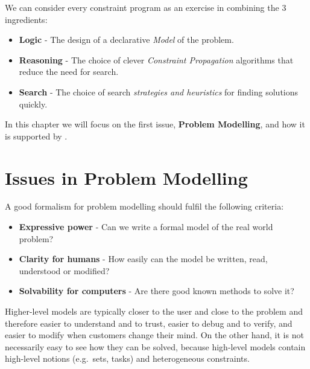 We can consider every constraint program as an exercise in
combining the 3 ingredients:
\begin{itemize}
\item {\bf Logic} -  The design of a declarative {\em Model} of the problem.
\item {\bf Reasoning} - The choice of clever {\em Constraint Propagation}
    algorithms that reduce the need for search.
\item {\bf Search} - The choice of search {\em strategies and heuristics} for
    finding solutions quickly.
\end{itemize}
In this chapter we will focus on the first issue, {\bf Problem Modelling},
and how it is supported by \eclipse{}.


\section{Issues in Problem Modelling}

A good formalism for problem modelling should fulfil the following criteria:
\begin{itemize}
\item {\bf Expressive power} - 
        Can we write a formal model of the real world problem?
\item {\bf Clarity for humans} - 
        How easily can the model be written, read, understood or modified?
\item {\bf Solvability for computers} - 
        Are there good known methods to solve it?
\end{itemize}
Higher-level models are typically
closer to the user and close to the problem and therefore
easier to understand and to trust,
easier to debug and to verify,
and easier to modify when customers change their mind.
On the other hand, it is not necessarily easy to see how they can be
solved, because high-level models contain
high-level notions (e.g.\ sets, tasks) and
heterogeneous constraints.


